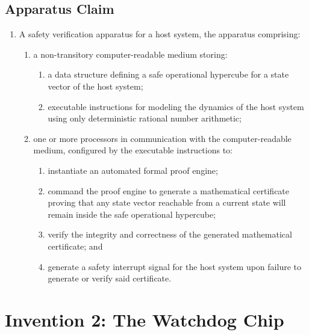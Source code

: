 \documentclass{article}
\begin{document}
\subsection*{Apparatus Claim}
\begin{enumerate}
    \item A safety verification apparatus for a host system, the apparatus comprising:
    \begin{enumerate}
        \item a non-transitory computer-readable medium storing:
        \begin{enumerate}
            \item a data structure defining a safe operational hypercube for a state vector of the host system;
            \item executable instructions for modeling the dynamics of the host system using only deterministic rational number arithmetic;
        \end{enumerate}
        \item one or more processors in communication with the computer-readable medium, configured by the executable instructions to:
        \begin{enumerate}
            \item instantiate an automated formal proof engine;
            \item command the proof engine to generate a mathematical certificate proving that any state vector reachable from a current state will remain inside the safe operational hypercube;
            \item verify the integrity and correctness of the generated mathematical certificate; and
            \item generate a safety interrupt signal for the host system upon failure to generate or verify said certificate.
        \end{enumerate}
    \end{enumerate}
\end{enumerate}

\newpage
\section{Invention 2: The Watchdog Chip}
\end{document}
